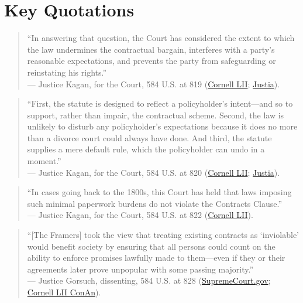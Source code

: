 \documentclass[12pt]{article}
\begin{document}
\section{Key Quotations}
\begin{quote}
``In answering that question, the Court has considered the extent to which the law undermines the contractual bargain, interferes with a party's reasonable expectations, and prevents the party from safeguarding or reinstating his rights.'' \\
--- Justice Kagan, for the Court, 584 U.S. at 819 (\href{https://www.law.cornell.edu/supremecourt/text/16-1432}{Cornell LII}; \href{https://supreme.justia.com/cases/federal/us/584/16-1432/}{Justia}).
\end{quote}

\begin{quote}
``First, the statute is designed to reflect a policyholder's intent---and so to support, rather than impair, the contractual scheme. Second, the law is unlikely to disturb any policyholder's expectations because it does no more than a divorce court could always have done. And third, the statute supplies a mere default rule, which the policyholder can undo in a moment.'' \\
--- Justice Kagan, for the Court, 584 U.S. at 820 (\href{https://www.law.cornell.edu/supremecourt/text/16-1432}{Cornell LII}; \href{https://supreme.justia.com/cases/federal/us/584/16-1432/}{Justia}).
\end{quote}

\begin{quote}
``In cases going back to the 1800s, this Court has held that laws imposing such minimal paperwork burdens do not violate the Contracts Clause.'' \\
--- Justice Kagan, for the Court, 584 U.S. at 822 (\href{https://www.law.cornell.edu/supremecourt/text/16-1432}{Cornell LII}).
\end{quote}

\begin{quote}
``[The Framers] took the view that treating existing contracts as `inviolable' would benefit society by ensuring that all persons could count on the ability to enforce promises lawfully made to them---even if they or their agreements later prove unpopular with some passing majority.'' \\
--- Justice Gorsuch, dissenting, 584 U.S. at 828 (\href{https://www.supremecourt.gov/opinions/17pdf/584us2r49_74h3.pdf}{SupremeCourt.gov}; \href{https://www.law.cornell.edu/constitution-conan/article-1/section-10/clause-1/historical-background-on-the-contract-clause}{Cornell LII ConAn}).
\end{quote}
\end{document}
